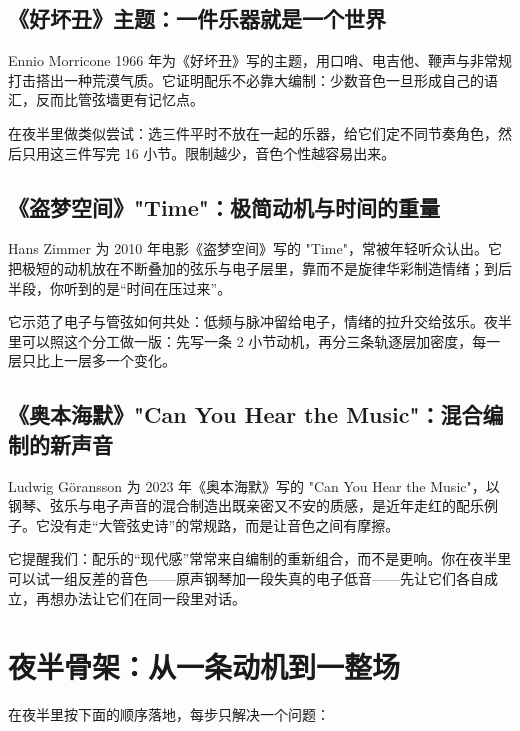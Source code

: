 \subsection{《好坏丑》主题：一件乐器就是一个世界}
\label{sec:film-case-morricone}

Ennio Morricone 1966 年为《好坏丑》写的主题，用口哨、电吉他、鞭声与非常规打击搭出一种荒漠气质。它证明配乐不必靠大编制：少数音色一旦形成自己的语汇，反而比管弦墙更有记忆点。

在夜半里做类似尝试：选三件平时不放在一起的乐器，给它们定不同节奏角色，然后只用这三件写完 16 小节。限制越少，音色个性越容易出来。

\subsection{《盗梦空间》"Time"：极简动机与时间的重量}
\label{sec:film-case-inception}

Hans Zimmer 为 2010 年电影《盗梦空间》写的 "Time"，常被年轻听众认出。它把极短的动机放在不断叠加的弦乐与电子层里，靠而不是旋律华彩制造情绪；到后半段，你听到的是“时间在压过来”。

它示范了电子与管弦如何共处：低频与脉冲留给电子，情绪的拉升交给弦乐。夜半里可以照这个分工做一版：先写一条 2 小节动机，再分三条轨逐层加密度，每一层只比上一层多一个变化。

\subsection{《奥本海默》"Can You Hear the Music"：混合编制的新声音}
\label{sec:film-case-oppenheimer}

Ludwig Göransson 为 2023 年《奥本海默》写的 "Can You Hear the Music"，以钢琴、弦乐与电子声音的混合制造出既亲密又不安的质感，是近年走红的配乐例子。它没有走“大管弦史诗”的常规路，而是让音色之间有摩擦。

它提醒我们：配乐的“现代感”常常来自编制的重新组合，而不是更响。你在夜半里可以试一组反差的音色——原声钢琴加一段失真的电子低音——先让它们各自成立，再想办法让它们在同一段里对话。

\section{夜半骨架：从一条动机到一整场}
\label{sec:film-yeban}

在夜半里按下面的顺序落地，每步只解决一个问题：

